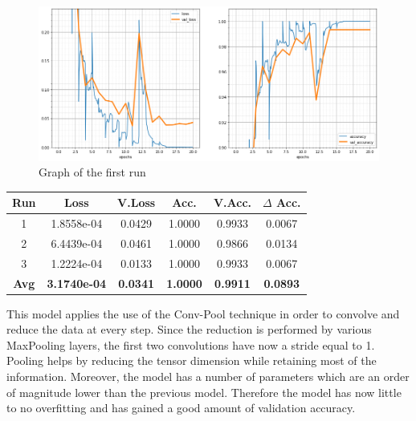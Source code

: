 \begin{figure}[H]
	\begin{center}
	\includegraphics[width=\linewidth]{Immagini/conv-pool-1}
	\caption{Graph of the first run}
	\end{center}
\end{figure}
\begin{table}[H]
	\centering
	\begin{tabular}{cccccc}
		\textbf{Run} &\textbf{Loss}&\textbf{V.Loss} &\textbf{Acc.}&\textbf{V.Acc.}&\textbf{$\Delta$ Acc.} \\ \hline
		1   & 1.8558e-04 &  0.0429  & 1.0000    & 0.9933    & 0.0067\\
		2   & 6.4439e-04 &  0.0461  & 1.0000    & 0.9866    & 0.0134\\
		3   & 1.2224e-04 &  0.0133  & 1.0000    & 0.9933    & 0.0067\\
		\textbf{Avg} & \textbf{3.1740e-04} &  \textbf{0.0341}  & \textbf{1.0000}    & \textbf{0.9911}    & \textbf{0.0893}
	\end{tabular}
\end{table}

This model applies the use of the Conv-Pool technique in order to convolve and reduce the data at every step. Since the reduction is performed by various MaxPooling layers, the first two convolutions have now a stride equal to 1. Pooling helps by reducing the tensor dimension while retaining most of the information. 
Moreover, the model has a number of parameters which are an order of magnitude lower than the previous model. Therefore the model has now little to no overfitting and has gained a good amount of validation accuracy.